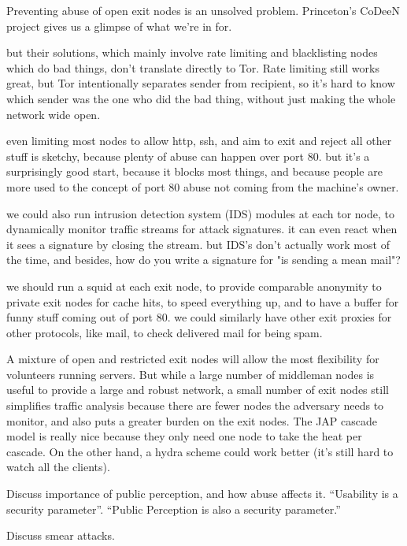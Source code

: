 \documentclass[times,10pt,twocolumn]{article}
\begin{document}
Preventing abuse of open exit nodes is an unsolved problem. Princeton's
CoDeeN project \cite{darkside} gives us a glimpse of what we're in for.

but their solutions, which mainly involve rate limiting and blacklisting
nodes which do bad things, don't translate directly to Tor. Rate limiting
still works great, but Tor intentionally separates sender from recipient,
so it's hard to know which sender was the one who did the bad thing,
without just making the whole network wide open.

even limiting most nodes to allow http, ssh, and aim to exit and reject
all other stuff is sketchy, because plenty of abuse can happen over
port 80. but it's a surprisingly good start, because it blocks most things,
and because people are more used to the concept of port 80 abuse not
coming from the machine's owner.

we could also run intrusion detection system (IDS) modules at each tor
node, to dynamically monitor traffic streams for attack signatures. it
can even react when it sees a signature by closing the stream. but IDS's
don't actually work most of the time, and besides, how do you write a
signature for "is sending a mean mail"?

we should run a squid at each exit node, to provide comparable anonymity
to private exit nodes for cache hits, to speed everything up, and to
have a buffer for funny stuff coming out of port 80. we could similarly
have other exit proxies for other protocols, like mail, to check
delivered mail for being spam.

A mixture of open and restricted exit nodes will allow the most
flexibility for volunteers running servers. But while a large number
of middleman nodes is useful to provide a large and robust network,
a small number of exit nodes still simplifies traffic analysis because
there are fewer nodes the adversary needs to monitor, and also puts a
greater burden on the exit nodes.
The JAP cascade model is really nice because they only need one node to
take the heat per cascade. On the other hand, a hydra scheme could work
better (it's still hard to watch all the clients).

Discuss importance of public perception, and how abuse affects it.
``Usability is a security parameter''.  ``Public Perception is also a
security parameter.''

Discuss smear attacks.

\label{subsec:dirservers}
\end{document}
